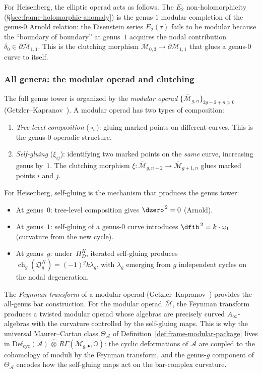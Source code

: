 For Heisenberg, the elliptic operad acts as follows. The
$E_2$ non-holomorphicity (\S\ref{sec:frame-holomorphic-anomaly})
is the genus-$1$ modular completion of the genus-$0$ Arnold
relation: the Eisenstein series $E_2(\tau)$ fails to be modular
because the ``boundary of boundary'' at genus~$1$
acquires the nodal contribution $\delta_0 \in
\partial\overline{\mathcal{M}}_{1,1}$. This is the clutching
morphism $\overline{\mathcal{M}}_{0,3} \to
\partial\overline{\mathcal{M}}_{1,1}$ that glues a genus-$0$
curve to itself.

\subsubsection*{All genera: the modular operad and clutching}

The full genus tower is organized by the \emph{modular operad}
$\{\overline{\mathcal{M}}_{g,n}\}_{2g-2+n>0}$
(Getzler--Kapranov~\cite{GeK98}). A modular operad has two types of
composition:
\begin{enumerate}
\item \emph{Tree-level composition} ($\circ_i$): gluing marked
 points on different curves. This is the genus-$0$ operadic
 structure.
\item \emph{Self-gluing} ($\xi_{ij}$): identifying two marked
 points on the \emph{same} curve, increasing genus by~$1$.
 The clutching morphism
 $\xi \colon \overline{\mathcal{M}}_{g,n+2}
 \to \overline{\mathcal{M}}_{g+1,n}$
 glues marked points $i$ and $j$.
\end{enumerate}

For Heisenberg, self-gluing is the mechanism that produces the
genus tower:
\begin{itemize}
\item At genus~$0$: tree-level composition gives $\dzero^{\,2} = 0$
 (Arnold).
\item At genus~$1$: self-gluing of a genus-$0$ curve introduces
 $\dfib^{\,2} = k \cdot \omega_1$ (curvature from the new cycle).
\item At genus~$g$: under~$H_D^K$, iterated self-gluing produces
 $\operatorname{ch}_g(\mathfrak O_g^K)=(-1)^gk\lambda_g$, with
 $\lambda_g$ emerging from $g$ independent cycles on the nodal degeneration.
\end{itemize}

The \emph{Feynman transform} of a modular operad (Getzler--Kapranov~\cite{GeK98})
provides the all-genus bar construction. For the modular operad
$\overline{\mathcal{M}}$, the Feynman transform produces a twisted
modular operad whose algebras are precisely curved
$A_\infty$-algebras with the curvature controlled by the
self-gluing maps. This is why the universal Maurer--Cartan class
$\Theta_{\mathcal{A}}$ of Definition~\ref{def:frame-modular-package}
lives in $\mathrm{Def}_{\mathrm{cyc}}(\mathcal{A})
\,\widehat{\otimes}\, R\Gamma(\overline{\mathcal{M}}_{g,\bullet},
\mathbb{Q})$: the cyclic deformations of $\mathcal{A}$ are coupled
to the cohomology of moduli by the Feynman transform, and the
genus-$g$ component of $\Theta_{\mathcal{A}}$ encodes how the
self-gluing maps act on the bar-complex curvature.

